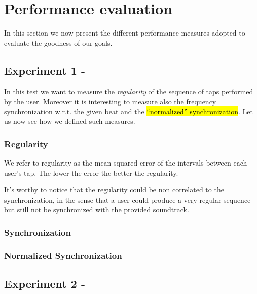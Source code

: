 \section*{Performance evaluation}
In this section we now present the different performance measures adopted to evaluate the goodness of our goals.

\subsection*{Experiment 1 - \testfirst}
In this test we want to measure the \emph{regularity} of the sequence of taps performed by the user. Moreover it is interesting to measure also the frequency synchronization w.r.t. the given beat and the \hl{``normalized'' synchronization}. 
Let us now see how we defined such measures.
\subsubsection*{Regularity}
We refer to regularity as the mean squared error of the intervals between each user's tap.
The lower the error the better the regularity.

It's worthy to notice that the regularity could be non correlated to the synchronization, in the sense that a user could produce a very regular sequence but still not be synchronized with the provided soundtrack.

\subsubsection*{Synchronization}

\subsubsection*{Normalized Synchronization}

\subsection*{Experiment 2 - \testsecond}
